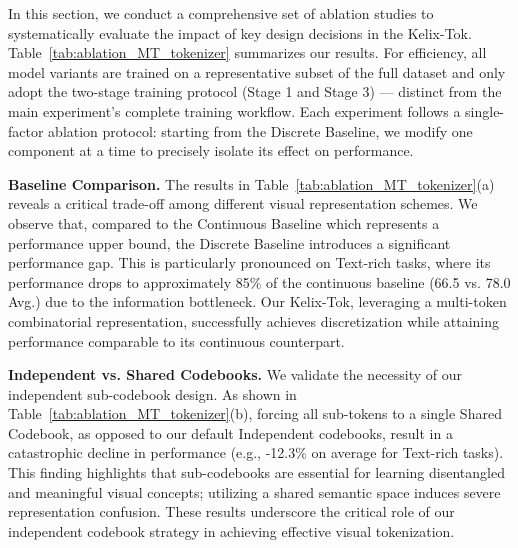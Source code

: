\documentclass[11pt, a4paper, logo, copyright]{googledeepmind}
\begin{document}
In this section, we conduct a comprehensive set of ablation studies to systematically evaluate the impact of key design decisions in the Kelix-Tok. Table~\ref{tab:ablation_MT_tokenizer} summarizes our results. For efficiency, all model variants are trained on a representative subset of the full dataset and only adopt the two-stage training protocol (Stage 1 and Stage 3) — distinct from the main experiment’s complete training workflow. Each experiment follows a single-factor ablation protocol: starting from the Discrete Baseline, we modify one component at a time to precisely isolate its effect on performance.

\textbf{Baseline Comparison.} The results in Table~\ref{tab:ablation_MT_tokenizer}(a) reveals a critical trade-off among different visual representation schemes. We observe that, compared to the Continuous Baseline which represents a performance upper bound, the Discrete Baseline introduces a significant performance gap. This is particularly pronounced on Text-rich tasks, where its performance drops to approximately 85\% of the continuous baseline (66.5 vs. 78.0 Avg.) due to the information bottleneck. 
Our Kelix-Tok, leveraging a multi-token combinatorial representation, successfully achieves discretization while attaining performance comparable to its continuous counterpart.




\textbf{Independent vs. Shared Codebooks.}
We validate the necessity of our independent sub-codebook design. As shown in Table~\ref{tab:ablation_MT_tokenizer}(b), forcing all sub-tokens to a single Shared Codebook, as opposed to our default Independent codebooks, result in a catastrophic decline in performance (e.g., -12.3\% on average for Text-rich tasks). This finding highlights that sub-codebooks are essential for learning disentangled and meaningful visual concepts; utilizing a shared semantic space induces severe representation confusion.  These results underscore the critical role of our independent codebook strategy in achieving effective visual tokenization.
\end{document}
